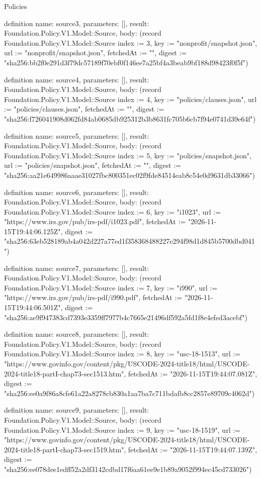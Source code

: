 \begin{lexlean}{Policies}
\begin{semanticmodule}
definition{
  name: source3,
  parameters: [],
  result: Foundation.Policy.V1.Model::Source,
  body: (record Foundation.Policy.V1.Model::Source {index := 3, key := "nonprofit/snapshot.json", url := "nonprofit/snapshot.json", fetchedAt := "", digest := "sha256:bb2f0e291d3f79dc57189f70ebf0f146ee7a25bf4a3beab9bf188d98423f0f5f"})
}

definition{
  name: source4,
  parameters: [],
  result: Foundation.Policy.V1.Model::Source,
  body: (record Foundation.Policy.V1.Model::Source {index := 4, key := "policies/clauses.json", url := "policies/clauses.json", fetchedAt := "", digest := "sha256:f726041908d062fd84ab0685db925312b3b8631fc705b6cb7f94e0741d39e64f"})
}

definition{
  name: source5,
  parameters: [],
  result: Foundation.Policy.V1.Model::Source,
  body: (record Foundation.Policy.V1.Model::Source {index := 5, key := "policies/snapshot.json", url := "policies/snapshot.json", fetchedAt := "", digest := "sha256:aa21e649986aaae31027fbc800351ec02f9fde84514eab8c54e0d9631db33066"})
}

definition{
  name: source6,
  parameters: [],
  result: Foundation.Policy.V1.Model::Source,
  body: (record Foundation.Policy.V1.Model::Source {index := 6, key := "i1023", url := "https://www.irs.gov/pub/irs-pdf/i1023.pdf", fetchedAt := "2026-11-15T19:44:06.125Z", digest := "sha256:63eb528189ab4a042d227a77ed1f358368488227e294f98d1d845b5700dbd041"})
}

definition{
  name: source7,
  parameters: [],
  result: Foundation.Policy.V1.Model::Source,
  body: (record Foundation.Policy.V1.Model::Source {index := 7, key := "i990", url := "https://www.irs.gov/pub/irs-pdf/i990.pdf", fetchedAt := "2026-11-15T19:44:06.501Z", digest := "sha256:ae9f947383cd7393e3359ff7977b4c7665e21496df592a5fd1f8e4efed3acebf"})
}

definition{
  name: source8,
  parameters: [],
  result: Foundation.Policy.V1.Model::Source,
  body: (record Foundation.Policy.V1.Model::Source {index := 8, key := "usc-18-1513", url := "https://www.govinfo.gov/content/pkg/USCODE-2024-title18/html/USCODE-2024-title18-partI-chap73-sec1513.htm", fetchedAt := "2026-11-15T19:44:07.081Z", digest := "sha256:ee0a9f86a8cfe61a22a8278cb830a1aa7ba7c711bdafb8cc2857e89709c4062d"})
}

definition{
  name: source9,
  parameters: [],
  result: Foundation.Policy.V1.Model::Source,
  body: (record Foundation.Policy.V1.Model::Source {index := 9, key := "usc-18-1519", url := "https://www.govinfo.gov/content/pkg/USCODE-2024-title18/html/USCODE-2024-title18-partI-chap73-sec1519.htm", fetchedAt := "2026-11-15T19:44:07.139Z", digest := "sha256:ee078dee1edff52a2df3142cdbd17f6aa61ee9e1b89a9052f994ec45cd733026"})
}


\end{semanticmodule}
\end{lexlean}

